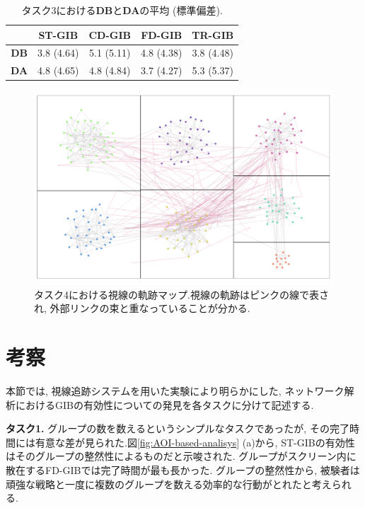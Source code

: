 \documentclass{kuee}
\begin{document}
\begin{table}[b]
  \begin{center}
  \caption{タスク3における{\bf DB}と{\bf DA}の平均 (標準偏差). \label{table:db_and_da_task3}}
  \begin{tabular}{|c|c|c|c|c|} \hline
  & ST-GIB & CD-GIB & FD-GIB & TR-GIB \\ \hline
  {\bf DB} & 3.8 (4.64) & 5.1 (5.11) & 4.8 (4.38) & 3.8 (4.48) \\ \hline
  {\bf DA} & 4.8 (4.65) & 4.8 (4.84) & 3.7 (4.27) & 5.3 (5.37) \\ \hline
  \end{tabular}
  \end{center}
\end{table}

\begin{figure}[t]
  \begin{center}
  \includegraphics[width=15cm]{./images/concentration.png}
  \caption{タスク4における視線の軌跡マップ.視線の軌跡はピンクの線で表され, 外部リンクの束と重なっていることが分かる. \label{fig:concentration}}
  \end{center}
\end{figure}

\section{考察}
本節では, 視線追跡システムを用いた実験により明らかにした, ネットワーク解析におけるGIBの有効性についての発見を各タスクに分けて記述する.

{\bf タスク1.} グループの数を数えるというシンプルなタスクであったが, その完了時間には有意な差が見られた.図\ref{fig:AOI-based-analisys} (a)から, ST-GIBの有効性はそのグループの整然性によるものだと示唆された.
グループがスクリーン内に散在するFD-GIBでは完了時間が最も長かった.
グループの整然性から, 被験者は頑強な戦略と一度に複数のグループを数える効率的な行動がとれたと考えられる.
\end{document}
